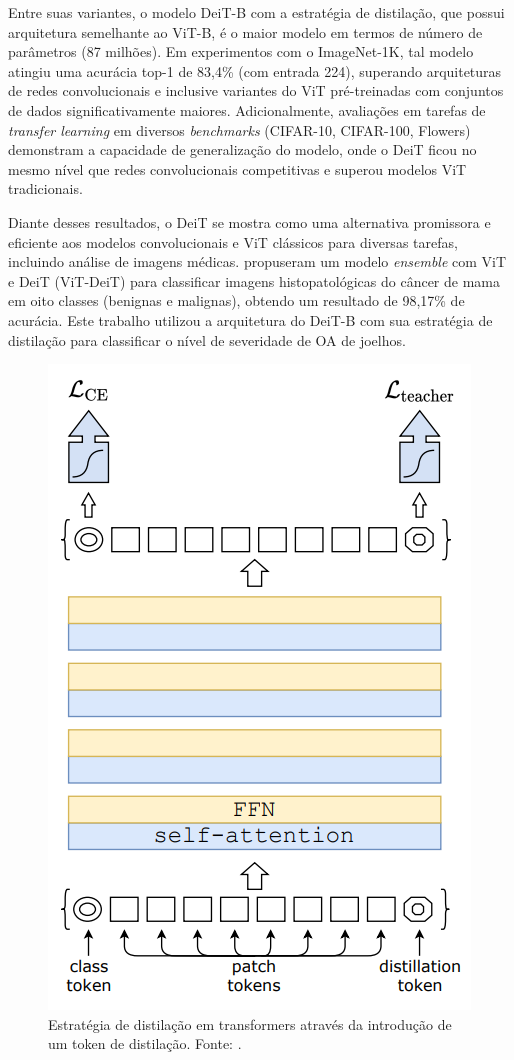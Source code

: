 Entre suas variantes, o modelo DeiT-B com a estratégia de distilação, que possui arquitetura semelhante ao ViT-B, é o maior modelo em termos de número de parâmetros (87 milhões). Em experimentos com o ImageNet-1K, tal modelo atingiu uma acurácia top-1 de 83,4\% (com entrada 224), superando arquiteturas de redes convolucionais e inclusive variantes do ViT pré-treinadas com conjuntos de dados significativamente maiores. Adicionalmente, avaliações em tarefas de \textit{transfer learning} em diversos \textit{benchmarks} (CIFAR-10, CIFAR-100, Flowers) demonstram a capacidade de generalização do modelo, onde o DeiT ficou no mesmo nível que redes convolucionais competitivas e superou modelos ViT tradicionais.

Diante desses resultados, o DeiT se mostra como uma alternativa promissora e eficiente aos modelos convolucionais e ViT clássicos para diversas tarefas, incluindo análise de imagens médicas. \cite{alotaibi2022} propuseram um modelo \textit{ensemble} com ViT e DeiT (ViT-DeiT) para classificar imagens histopatológicas do câncer de mama em oito classes (benignas e malignas), obtendo um resultado de 98,17\% de acurácia. Este trabalho utilizou a arquitetura do DeiT-B com sua estratégia de distilação para classificar o nível de severidade de OA de joelhos.

\begin{figure}[h]
    \centering
    \includegraphics[width=0.5\linewidth]{figs/distillation-procedure-deit.png}
    \caption{Estratégia de distilação em transformers através da introdução de um token de distilação. Fonte: \cite{Touvron2021}.}
    \label{fig:distillation-procedure}
\end{figure}

